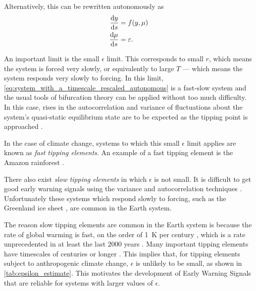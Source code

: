Alternatively, this can be rewritten autonomously as
\begin{subequations}
  \label{eq:system_with_a_timescale_rescaled_autonomous}
  \begin{align}
    \dv{y}{s} &= f(y,\mu) \\
    \dv{\mu}{s} &= \varepsilon.
  \end{align}
\end{subequations}

An important limit  is the small $\epsilon$ limit. This corresponds to small $r$, which means the system is forced very slowly, or equivalently to
large $T$ --- which means the system responds very slowly to forcing. In this limit, \cref{eq:system_with_a_timescale_rescaled_autonomous} is a
fast-slow system \parencite{Kuehn2011} and the usual tools of bifurcation theory can be applied without too much difficulty. In this case,
rises in the autocorrelation and variance of fluctuations about the system's quasi-static equilibrium state are to be expected as the tipping point is approached  \parencite{Scheffer2009}.

In the case of climate change, systems to which this small $\epsilon$ limit applies are known as \emph{fast tipping elements}. An example of a fast tipping element is
the Amazon rainforest \parencite{Ritchie2021}.

There also exist \emph{slow tipping elements} in which $\epsilon$ is not small. It is difficult to get good early warning signals
using the variance and autocorrelation techniques \parencite{VanderBolt2021}. Unfortunately these systems which respond slowly to forcing, such as the Greenland ice
sheet \parencite{Ritchie2021}, are common in the Earth system.

The reason slow tipping elements are common in the Earth system is because the rate of global warming is fast,
on the order of \SI{1}{\kelvin} per century \parencite{Osborn2021}, which is a rate unprecedented in at least
the last 2000 years \parencite{AR6}. Many important tipping elements have timescales of centuries or longer \parencite{Lenton2008,ArmstrongMcKay2022}.
This implies that, for tipping elements subject to anthropogenic climate change, $\epsilon$ is unlikely to be small, as shown in \cref{tab:epsilon_estimate}.
This motivates the development of Early Warning Signals that are reliable for systems with larger values of $\epsilon$.

